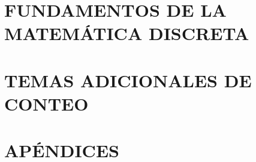 \documentclass{monochrome}
\begin{document}

\pagestyle{fancy}
\pagestyle{empty}



\renewcommand{\contentsname}{CONTENIDO}
\hypersetup{hidelinks}
\TOCPage%
\tableofcontents
\label{toc-contents}
\restoregeometry

\pagestyle{fancy}

%

%

\part{FUNDAMENTOS DE LA MATEMÁTICA DISCRETA}











\part{TEMAS ADICIONALES DE CONTEO}







\part*{APÉNDICES}

\appendix




\end{document}
